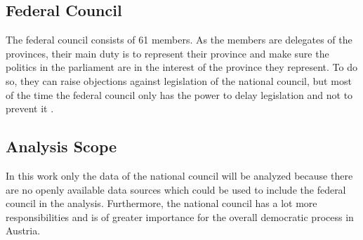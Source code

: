 \subsection{Federal Council}
The federal council consists of 61 members. As the members are delegates of the provinces, their main duty is to represent their province and make sure the politics in the parliament are in the interest of the province they represent. To do so, they can raise objections against legislation of the national council, but most of the time the federal council only has the power to delay legislation and not to prevent it \cite{AustrianParliament_2015}.

\subsection{Analysis Scope}
In this work only the data of the national council will be analyzed because there are no openly available data sources which could be used to include the federal council in the analysis. Furthermore, the national council has a lot more responsibilities and is of greater importance for the overall democratic process in Austria.